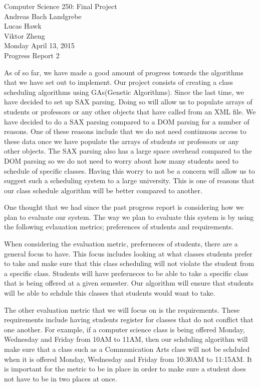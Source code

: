 \documentclass{article}
\begin{document}
\begin{center}
Computer Science 250: Final Project
\\
Andreas Bach Landgrebe
\\
Lucas Hawk
\\
Viktor Zheng
\\
Monday April 13, 2015
\\
Progress Report 2
\end{center}
\newpage
\doublespacing
As of so far, we have made a good amount of progress towards the algorithms that we have set out to implement. Our project consists of creating a class scheduling algorithms using GAs(Genetic Algorithms). Since the last time, we have decided to set up SAX parsing. Doing so will allow us to populate arrays of students or professors or any other objects that have called from an XML file. We have decided to do a SAX parsing compared to a DOM parsing for a number of reasons. One of these reasons include that we do not need continuous access to these data once we have populate the arrays of students or professors or any other objects. The SAX parsing also has a large space overhead compared to the DOM parsing so we do not need to worry about how many students need to schedule of specific classes. Having this worry to not be a concern will allow us to suggest such a scheduling system to a large university. This is one of reasons that our class schedule algorithm will be better compared to another. 
\par
One thought that we had since the past progress report is considering how we plan to evaluate our system. The way we plan to evaluate this system is by using the following evlauation metrics; preferences of students and requirements.
\par
When considering the evaluation metric, preferneces of students, there are a general focus to have. This focus includes looking at what classes students prefer to take and make sure that this class scheduling will not violate the student from a specific class. Students will have preferneces to be able to take a specific class that is being offered at a given semester. Our algorithm will ensure that students will be able to schdule this classes that students would want to take. 
\par
The other evaluation metric that we will focus on is the requirements. These requirements include having students register for classes that do not conflict that one another. For example, if a computer science class is being offered Monday, Wednesday and Friday from 10AM to 11AM, then our schduling algorithm will make sure that a class such as a Communication Arts class will not be schduled when it is offered Monday, Wednesday and Friday from 10:30AM to 11:15AM. It is important for the metric to be in place in order to make sure a student does not have to be in two places at once. 
\end{document}
